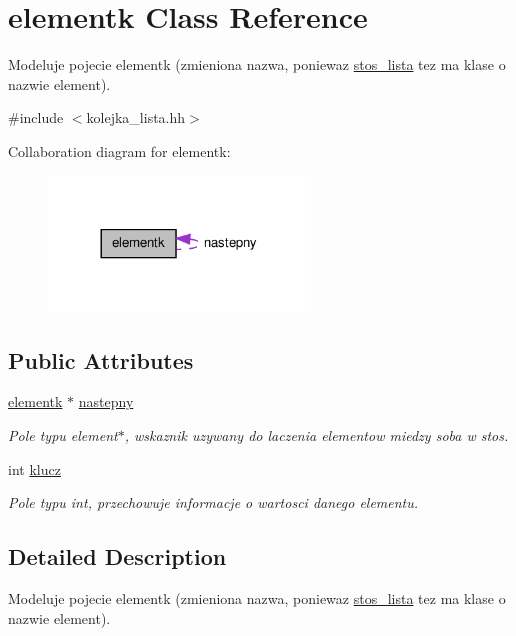 \hypertarget{classelementk}{\section{elementk Class Reference}
\label{classelementk}
}


Modeluje pojecie elementk (zmieniona nazwa, poniewaz \hyperlink{classstos__lista}{stos\-\_\-lista} tez ma klase o nazwie element).  




{\ttfamily \#include $<$kolejka\-\_\-lista.\-hh$>$}



Collaboration diagram for elementk\-:\nopagebreak
\begin{figure}[H]
\begin{center}
\leavevmode
\includegraphics[width=197pt]{classelementk__coll__graph}
\end{center}
\end{figure}
\subsection*{Public Attributes}
\begin{DoxyCompactItemize}
\item 
\hyperlink{classelementk}{elementk} $\ast$ \hyperlink{classelementk_a651594e4ecff4a674b7df913b68b1d55}{nastepny}
\begin{DoxyCompactList}\small\item\em Pole typu element$\ast$, wskaznik uzywany do laczenia elementow miedzy soba w stos. \end{DoxyCompactList}\item 
int \hyperlink{classelementk_a80de941ecbf60bd5189d1c1005c68203}{klucz}
\begin{DoxyCompactList}\small\item\em Pole typu int, przechowuje informacje o wartosci danego elementu. \end{DoxyCompactList}\end{DoxyCompactItemize}


\subsection{Detailed Description}
Modeluje pojecie elementk (zmieniona nazwa, poniewaz \hyperlink{classstos__lista}{stos\-\_\-lista} tez ma klase o nazwie element). 


